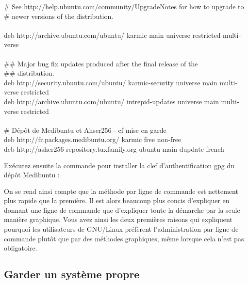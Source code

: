 {%
	\begin{breakbox}%
		\begin{otherlanguage}{english}%
\# See http://help.ubuntu.com/community/UpgradeNotes for how to upgrade to\\
\# newer versions of the distribution.\\
\\
deb http://archive.ubuntu.com/ubuntu/ karmic main universe restricted multiverse\\
\\
\#\# Major bug fix updates produced after the final release of the\\
\#\# distribution.\\
deb http://security.ubuntu.com/ubuntu/ karmic-security universe main multiverse restricted\\
deb http://archive.ubuntu.com/ubuntu/ intrepid-updates universe main multiverse restricted\\
\\
\# Dépôt de Medibuntu et Ahser256 - cf mise en garde\\
deb http://fr.packages.medibuntu.org/ karmic free non-free\\
deb http://asher256-repository.tuxfamily.org ubuntu main dupdate french\\
		\end{otherlanguage}%
	\end{breakbox}%
\par
Exécutez ensuite la commande pour installer la clef d'authentification gpg du dépôt Medibuntu :\\\par
\begin{nota}
On se rend ainsi compte que la méthode par ligne de commande est nettement plus rapide que la première. Il est alors beaucoup plus concis d'expliquer en donnant une ligne de commande que d'expliquer toute la démarche par la seule manière graphique. Vous avez ainsi les deux premières raisons qui expliquent pourquoi les utilisateurs de GNU/Linux préfèrent l'administration par ligne de commande plutôt que par des méthodes graphiques, même lorsque cela n'est pas obligatoire.
\end{nota}
\subsection{Garder un système propre}
\label{RefNettoyerSysteme}
}
